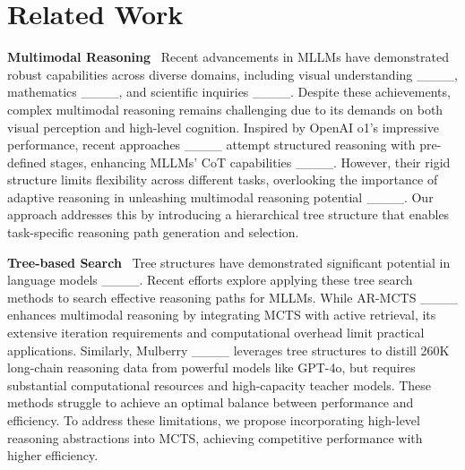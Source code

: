 \section{Related Work}
\label{sec2}
\textbf{Multimodal Reasoning}
$\,$ Recent advancements in MLLMs have demonstrated robust capabilities across diverse domains, including visual understanding ____, mathematics ____, and scientific inquiries ____. Despite these achievements, complex multimodal reasoning remains challenging due to its demands on both visual perception and high-level cognition. Inspired by OpenAI o1's impressive performance, recent approaches ____ attempt structured reasoning with pre-defined stages, enhancing MLLMs' CoT capabilities ____. However, their rigid structure limits flexibility across different tasks, overlooking the importance of adaptive reasoning in unleashing multimodal reasoning potential ____. Our approach addresses this by introducing a hierarchical tree structure that enables task-specific reasoning path generation and selection.

\vskip 0.0827in
\textbf{Tree-based Search}
$\,$ Tree structures have demonstrated significant potential in language models ____. Recent efforts explore applying these tree search methods to search effective reasoning paths for MLLMs. While AR-MCTS ____ enhances multimodal reasoning by integrating MCTS with active retrieval, its extensive iteration requirements and computational overhead limit practical applications. Similarly, Mulberry ____ leverages tree structures to distill 260K long-chain reasoning data from powerful models like GPT-4o, but requires substantial computational resources and high-capacity teacher models. These methods struggle to achieve an optimal balance between performance and efficiency. To address these limitations, we propose incorporating high-level reasoning abstractions into MCTS, achieving competitive performance with higher efficiency.